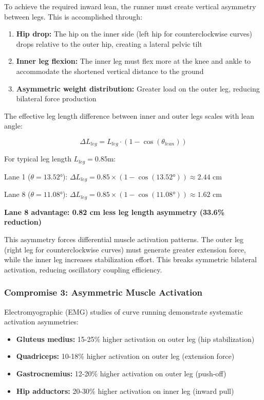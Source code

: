 To achieve the required inward lean, the runner must create vertical asymmetry between legs. This is accomplished through:

\begin{enumerate}
    \item \textbf{Hip drop:} The hip on the inner side (left hip for counterclockwise curves) drops relative to the outer hip, creating a lateral pelvic tilt
    \item \textbf{Inner leg flexion:} The inner leg must flex more at the knee and ankle to accommodate the shortened vertical distance to the ground
    \item \textbf{Asymmetric weight distribution:} Greater load on the outer leg, reducing bilateral force production
\end{enumerate}

The effective leg length difference between inner and outer legs scales with lean angle:

\begin{equation}
\Delta L_{leg} = L_{leg} \cdot (1 - \cos(\theta_{lean}))
\end{equation}

For typical leg length $L_{leg} = 0.85$m:

Lane 1 ($\theta = 13.52°$): $\Delta L_{leg} = 0.85 \times (1 - \cos(13.52°)) \approx 2.44$ cm

Lane 8 ($\theta = 11.08°$): $\Delta L_{leg} = 0.85 \times (1 - \cos(11.08°)) \approx 1.62$ cm

\textbf{Lane 8 advantage: 0.82 cm less leg length asymmetry (33.6\% reduction)}

This asymmetry forces differential muscle activation patterns. The outer leg (right leg for counterclockwise curves) must generate greater extension force, while the inner leg increases stabilization effort. This breaks symmetric bilateral activation, reducing oscillatory coupling efficiency.

\subsubsection{Compromise 3: Asymmetric Muscle Activation}

Electromyographic (EMG) studies of curve running demonstrate systematic activation asymmetries:

\begin{itemize}
    \item \textbf{Gluteus medius:} 15-25\% higher activation on outer leg (hip stabilization)
    \item \textbf{Quadriceps:} 10-18\% higher activation on outer leg (extension force)
    \item \textbf{Gastrocnemius:} 12-20\% higher activation on outer leg (push-off)
    \item \textbf{Hip adductors:} 20-30\% higher activation on inner leg (inward pull)
\end{itemize}

